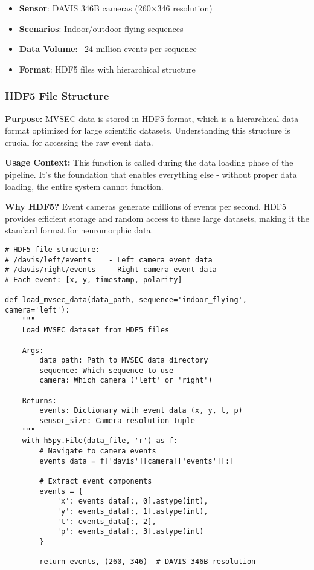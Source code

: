 \documentclass[12pt,a4paper]{article}
\begin{document}
\begin{itemize}
    \item \textbf{Sensor}: DAVIS 346B cameras (260×346 resolution)
    \item \textbf{Scenarios}: Indoor/outdoor flying sequences
    \item \textbf{Data Volume}: ~24 million events per sequence
    \item \textbf{Format}: HDF5 files with hierarchical structure
\end{itemize}

\subsubsection{HDF5 File Structure}

\textbf{Purpose:} MVSEC data is stored in HDF5 format, which is a hierarchical data format optimized for large scientific datasets. Understanding this structure is crucial for accessing the raw event data.

\textbf{Usage Context:} This function is called during the data loading phase of the pipeline. It's the foundation that enables everything else - without proper data loading, the entire system cannot function.

\textbf{Why HDF5?} Event cameras generate millions of events per second. HDF5 provides efficient storage and random access to these large datasets, making it the standard format for neuromorphic data.

\begin{lstlisting}[caption={MVSEC HDF5 File Navigation - Core Data Access Function}]
# HDF5 file structure:
# /davis/left/events    - Left camera event data
# /davis/right/events   - Right camera event data
# Each event: [x, y, timestamp, polarity]

def load_mvsec_data(data_path, sequence='indoor_flying', camera='left'):
    """
    Load MVSEC dataset from HDF5 files
    
    Args:
        data_path: Path to MVSEC data directory
        sequence: Which sequence to use
        camera: Which camera ('left' or 'right')
    
    Returns:
        events: Dictionary with event data (x, y, t, p)
        sensor_size: Camera resolution tuple
    """
    with h5py.File(data_file, 'r') as f:
        # Navigate to camera events
        events_data = f['davis'][camera]['events'][:]
        
        # Extract event components
        events = {
            'x': events_data[:, 0].astype(int),
            'y': events_data[:, 1].astype(int), 
            't': events_data[:, 2],
            'p': events_data[:, 3].astype(int)
        }
        
        return events, (260, 346)  # DAVIS 346B resolution
\end{lstlisting}
\end{document}
